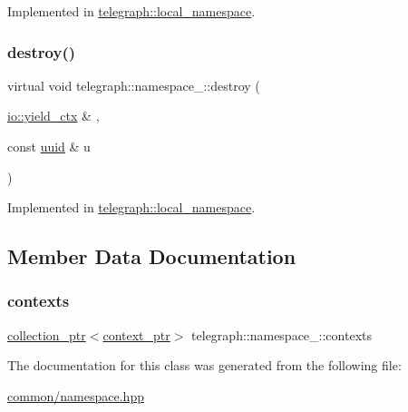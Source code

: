 Implemented in \hyperlink{classtelegraph_1_1local__namespace_a5ebe002275408c950d8fd44b829434e4}{telegraph\+::local\+\_\+namespace}.

\mbox{\label{classtelegraph_1_1namespace___ad077446ed8ad4b099ddc050067e14f9d}} 
\subsubsection{\texorpdfstring{destroy()}{destroy()}}
{\footnotesize\ttfamily virtual void telegraph\+::namespace\+\_\+\+::destroy (\begin{DoxyParamCaption}\item[{\hyperlink{structboost_1_1asio_1_1yield__ctx}{io\+::yield\+\_\+ctx} \&}]{,  }\item[{const \hyperlink{namespacetelegraph_a51ee91d7eaeef067f7ccac2b170e5d59}{uuid} \&}]{u }\end{DoxyParamCaption})\hspace{0.3cm}{\ttfamily [pure virtual]}}



Implemented in \hyperlink{classtelegraph_1_1local__namespace_aae3c0b770ea3bd29b1e4dfac7cfd805f}{telegraph\+::local\+\_\+namespace}.



\subsection{Member Data Documentation}
\mbox{\label{classtelegraph_1_1namespace___a04ffdef6fc2b8c0ed4b02ba3f039b27a}} 
\subsubsection{\texorpdfstring{contexts}{contexts}}
{\footnotesize\ttfamily \hyperlink{namespacetelegraph_a4fa3678b3fd260dc79a98bea50d582fd}{collection\+\_\+ptr}$<$\hyperlink{namespacetelegraph_a332e681f0d44a1308cf3a013a9dd140f}{context\+\_\+ptr}$>$ telegraph\+::namespace\+\_\+\+::contexts}



The documentation for this class was generated from the following file\+:\begin{DoxyCompactItemize}
\item 
\hyperlink{common_2namespace_8hpp}{common/namespace.\+hpp}\end{DoxyCompactItemize}

